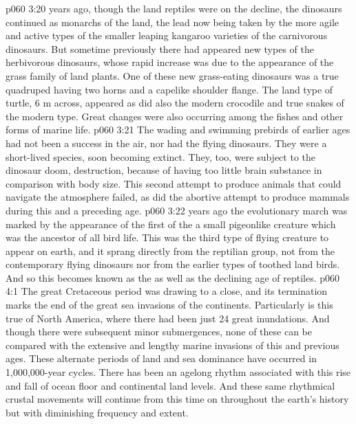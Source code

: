 \vs p060 3:20 \pc {} years ago, though the land reptiles were on the decline, the dinosaurs continued as monarchs of the land, the lead now being taken by the more agile and active types of the smaller leaping kangaroo varieties of the carnivorous dinosaurs. But sometime previously there had appeared new types of the herbivorous dinosaurs, whose rapid increase was due to the appearance of the grass family of land plants. One of these new grass\hyp{}eating dinosaurs was a true quadruped having two horns and a capelike shoulder flange. The land type of turtle, 6 m across, appeared as did also the modern crocodile and true snakes of the modern type. Great changes were also occurring among the fishes and other forms of marine life.
\vs p060 3:21 The wading and swimming prebirds of earlier ages had not been a success in the air, nor had the flying dinosaurs. They were a short\hyp{}lived species, soon becoming extinct. They, too, were subject to the dinosaur doom, destruction, because of having too little brain substance in comparison with body size. This second attempt to produce animals that could navigate the atmosphere failed, as did the abortive attempt to produce mammals during this and a preceding age.
\vs p060 3:22 \pc {} years ago the evolutionary march was marked by the  appearance of the first of the  a small pigeonlike creature which was the ancestor of all bird life. This was the third type of flying creature to appear on earth, and it sprang directly from the reptilian group, not from the contemporary flying dinosaurs nor from the earlier types of toothed land birds. And so this becomes known as the  as well as the declining age of reptiles.
\vs p060 4:1 The great Cretaceous period was drawing to a close, and its termination marks the end of the great sea invasions of the continents. Particularly is this true of North America, where there had been just 24 great inundations. And though there were subsequent minor submergences, none of these can be compared with the extensive and lengthy marine invasions of this and previous ages. These alternate periods of land and sea dominance have occurred in 1,000,000\hyp{}year cycles. There has been an agelong rhythm associated with this rise and fall of ocean floor and continental land levels. And these same rhythmical crustal movements will continue from this time on throughout the earth’s history but with diminishing frequency and extent.
